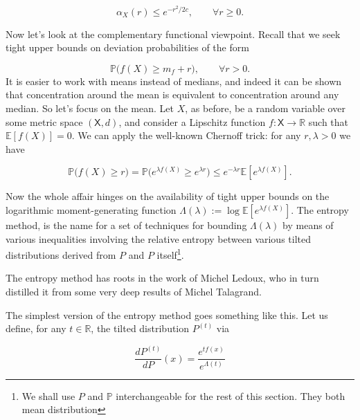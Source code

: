 \documentclass[12pt, oneside, a4paper]{article}
\theoremstyle{plain}
\theoremstyle{definition}
\begin{document}
\begin{equation*} \alpha_X(r) \le e^{-r^2/2c}, \qquad \forall r \ge 0. \end{equation*}

Now let’s look at the complementary functional viewpoint. Recall that we seek tight upper bounds on deviation probabilities of the form

\begin{equation*} \mathbb {P}\Big( f(X) \ge m_f + r \Big), \qquad \forall r > 0. 
\end{equation*}
 It is easier to work with means instead of medians, and indeed it can be shown that concentration around the mean is equivalent to concentration
 around any median. So let’s focus on the mean. Let $X$, as before, be a random variable over some metric space $(\mathsf{X},d)$, and consider a
 Lipschitz function $f : \mathsf{X} \rightarrow \mathbb {R}$ such that $\mathbb{E}[f(X)] = 0$. 
 We can apply the well-known Chernoff trick: for any $r,\lambda > 0$ we have

\begin{equation*}\mathbb {P}\Big( f(X) \ge r \Big) = \mathbb{P}\Big( e^{\lambda f(X)} \ge e^{\lambda r} \Big) \le e^{-\lambda r} \mathbb{E}[e^{\lambda 
f(X)}]. \end{equation*}

Now the whole affair hinges on the availability of tight upper bounds on the logarithmic moment-generating function 
$\Lambda(\lambda) := \log \mathbb {E}[e^{\lambda f(X)}]$. 
The entropy method\cite{Raginsky_ConcMeasure,Ledoux_lecture_notes}, is the name for a set of techniques for bounding $\Lambda(\lambda)$ by means 
of various inequalities involving the relative entropy between various tilted distributions derived from
 $P$ and $P$ itself\footnote{We shall use $P$ and $\mathbb{P}$ interchangeable for the rest of this section. They both 
mean distribution}.

The entropy method has roots in the work of Michel Ledoux, who in turn distilled it from some very deep results of
 Michel Talagrand\cite{TalagrandInequality,Ledoux,Ledoux_lecture_notes}.

The simplest version of the entropy method goes something like this.
 Let us define, for any $t \in \mathbb{R}$, the tilted distribution $P^{(t)}$ via

\begin{equation*} \frac{dP^{(t)}}{dP}(x) = \frac{e^{tf(x)}}{e^{\Lambda(t)}} 
\end{equation*}
\end{document}
